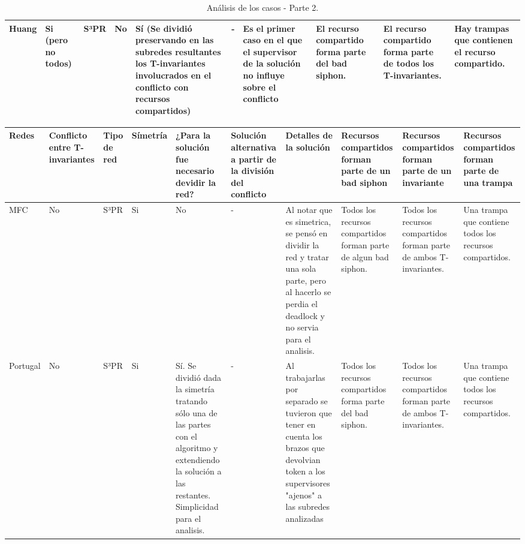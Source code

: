 \begin{landscape}
\begin{table}[H]
\begin{tabular}{|p{1cm}|p{1.5cm}|p{0.7cm}|p{1cm}|p{4.8cm}|p{1.5cm}|p{2cm}|p{1.7cm}|p{2cm}|p{2cm}|}
    Huang & Si (pero no todos) & S³PR & No & Sí (Se dividió preservando en las subredes resultantes los T-invariantes involucrados en el conflicto con recursos compartidos) & - & Es el primer caso en el que el supervisor de la solución no influye sobre el conflicto & El recurso compartido forma parte del bad siphon. & El recurso compartido forma parte de todos los T-invariantes. & Hay trampas que contienen el recurso compartido.  \\  
    \hline   
    \end{tabular}
    \caption{Análisis de los casos - Parte 2.}
    \label{tab:Analisis-Casos2}
\end{table}

 \begin{table}[H]
    \scriptsize 
    \centering
    \begin{tabular}{|p{1cm}|p{1.5cm}|p{0.7cm}|p{1cm}|p{4.5cm}|p{1.2cm}|p{3.2cm}|p{2cm}|p{2cm}|p{1.6cm}|}
    \hline
    \textbf{Redes} & \textbf{Conflicto entre T-invariantes} & \textbf{Tipo de red} & \textbf{Símetría} & \textbf{¿Para la solución fue necesario devidir la red?} & \textbf{Solución alternativa a partir de la división del conflicto} & \textbf{Detalles de la solución} & \textbf{Recursos compartidos forman parte de un bad siphon} & \textbf{Recursos compartidos forman parte de un invariante} & \textbf{Recursos compartidos forman parte de una trampa }  \\  \hline
    
    MFC & No & S³PR & Si & No & - & Al notar que es simetrica, se pensó en dividir la red y tratar una sola parte, pero al hacerlo se perdia el deadlock y no servia para el analisis. & Todos los recursos compartidos forman parte de algun bad siphon. & Todos los recursos compartidos forman parte de ambos T-invariantes. & Una trampa que contiene todos los recursos compartidos. \\
    \hline
    
    Portugal & No & S³PR & Si & Sí. Se dividió dada la simetría tratando sólo una de las partes con el algoritmo y extendiendo la solución a las restantes. Simplicidad para el analisis. & - & Al trabajarlas por separado se tuvieron que tener en cuenta los brazos que devolvian token a los supervisores "ajenos" a las subredes analizadas & Todos los recursos compartidos forma parte del bad siphon. & Todos los recursos compartidos forman parte de ambos T-invariantes. & Una trampa que contiene todos los recursos compartidos. \\
    \hline
    

\end{tabular}
\end{table}
\end{landscape}
